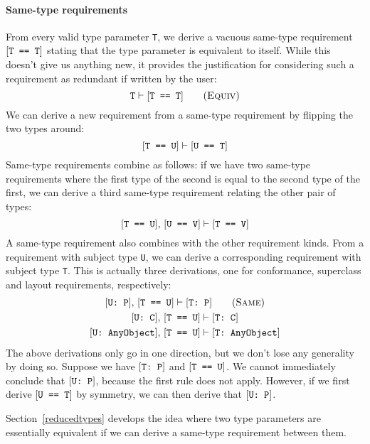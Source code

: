 \documentclass[../generics]{subfiles}
\begin{document}
\paragraph{Same-type requirements}
From every valid type parameter \texttt{T}, we derive a vacuous same-type requirement $[\texttt{T == T}]$ stating that the type parameter is equivalent to itself. While this doesn't give us anything new, it provides the justification for considering such a requirement as redundant if written by the user:
\[\texttt{T}\vdash\FormalReq{T == T}\tag{\textsc{Equiv}}\]
We can derive a new requirement from a same-type requirement by flipping the two types around:
\[[\texttt{T == U}]\vdash[\texttt{U == T}]\]
Same-type requirements combine as follows: if we have two same-type requirements where the first type of the second is equal to the second type of the first, we can derive a third same-type requirement relating the other pair of types:
\[[\texttt{T == U}],\,[\texttt{U == V}]\vdash[\texttt{T == V}]\]
A same-type requirement  also combines with the other requirement kinds. From a requirement with subject type \texttt{U}, we can derive a corresponding requirement with subject type \texttt{T}. This is actually three derivations, one for conformance, superclass and layout requirements, respectively:
\begin{gather*}
\ConfReq{U}{P},\,\FormalReq{T == U}\vdash\ConfReq{T}{P}\tag{\textsc{Same}}\\
\ConfReq{U}{C},\,\FormalReq{T == U}\vdash\ConfReq{T}{C}\\
\ConfReq{U}{AnyObject},\,\FormalReq{T == U}\vdash\ConfReq{T}{AnyObject}
\end{gather*}
The above derivations only go in one direction, but we don't lose any generality by doing so. Suppose we have $[\texttt{T:~P}]$ and $[\texttt{T == U}]$. We cannot immediately conclude that $[\texttt{U:~P}]$, because the first rule does not apply. However, if we first derive $[\texttt{U == T}]$ by symmetry, we can then derive that $[\texttt{U:~P}]$.

Section~\ref{reducedtypes} develops the idea where two type parameters are essentially equivalent if we can derive a same-type requirement between them.
\end{document}
